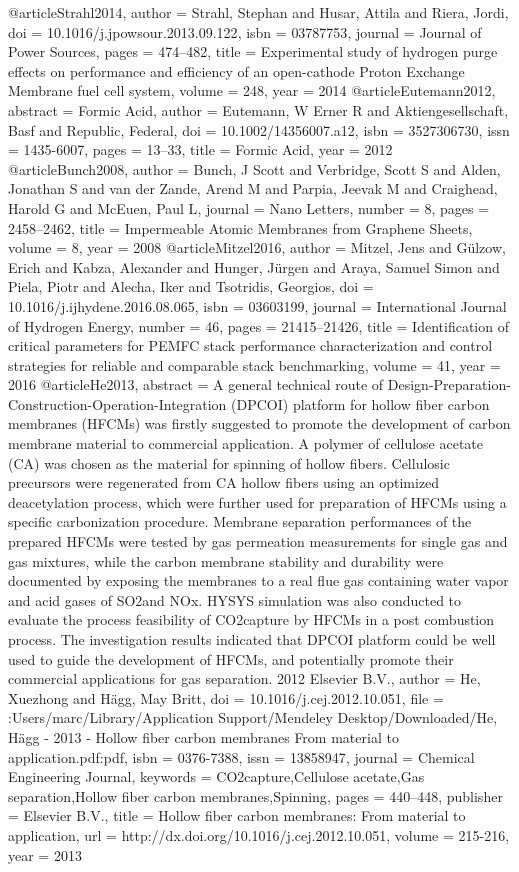 @article{Strahl2014,
author = {Strahl, Stephan and Husar, Attila and Riera, Jordi},
doi = {10.1016/j.jpowsour.2013.09.122},
isbn = {03787753},
journal = {Journal of Power Sources},
pages = {474--482},
title = {{Experimental study of hydrogen purge effects on performance and efficiency of an open-cathode Proton Exchange Membrane fuel cell system}},
volume = {248},
year = {2014}
}
@article{Eutemann2012,
abstract = {Formic Acid},
author = {Eutemann, W Erner R and Aktiengesellschaft, Basf and Republic, Federal},
doi = {10.1002/14356007.a12},
isbn = {3527306730},
issn = {1435-6007},
pages = {13--33},
title = {{Formic Acid}},
year = {2012}
}
@article{Bunch2008,
author = {Bunch, J Scott and Verbridge, Scott S and Alden, Jonathan S and van der Zande, Arend M and Parpia, Jeevak M and Craighead, Harold G and McEuen, Paul L},
journal = {Nano Letters},
number = {8},
pages = {2458--2462},
title = {{Impermeable Atomic Membranes from Graphene Sheets}},
volume = {8},
year = {2008}
}
@article{Mitzel2016,
author = {Mitzel, Jens and G{\"{u}}lzow, Erich and Kabza, Alexander and Hunger, J{\"{u}}rgen and Araya, Samuel Simon and Piela, Piotr and Alecha, Iker and Tsotridis, Georgios},
doi = {10.1016/j.ijhydene.2016.08.065},
isbn = {03603199},
journal = {International Journal of Hydrogen Energy},
number = {46},
pages = {21415--21426},
title = {{Identification of critical parameters for PEMFC stack performance characterization and control strategies for reliable and comparable stack benchmarking}},
volume = {41},
year = {2016}
}
@article{He2013,
abstract = {A general technical route of Design-Preparation-Construction-Operation-Integration (DPCOI) platform for hollow fiber carbon membranes (HFCMs) was firstly suggested to promote the development of carbon membrane material to commercial application. A polymer of cellulose acetate (CA) was chosen as the material for spinning of hollow fibers. Cellulosic precursors were regenerated from CA hollow fibers using an optimized deacetylation process, which were further used for preparation of HFCMs using a specific carbonization procedure. Membrane separation performances of the prepared HFCMs were tested by gas permeation measurements for single gas and gas mixtures, while the carbon membrane stability and durability were documented by exposing the membranes to a real flue gas containing water vapor and acid gases of SO2and NOx. HYSYS simulation was also conducted to evaluate the process feasibility of CO2capture by HFCMs in a post combustion process. The investigation results indicated that DPCOI platform could be well used to guide the development of HFCMs, and potentially promote their commercial applications for gas separation. {\textcopyright} 2012 Elsevier B.V.},
author = {He, Xuezhong and H{\"{a}}gg, May Britt},
doi = {10.1016/j.cej.2012.10.051},
file = {:Users/marc/Library/Application Support/Mendeley Desktop/Downloaded/He, H{\"{a}}gg - 2013 - Hollow fiber carbon membranes From material to application.pdf:pdf},
isbn = {0376-7388},
issn = {13858947},
journal = {Chemical Engineering Journal},
keywords = {CO2capture,Cellulose acetate,Gas separation,Hollow fiber carbon membranes,Spinning},
pages = {440--448},
publisher = {Elsevier B.V.},
title = {{Hollow fiber carbon membranes: From material to application}},
url = {http://dx.doi.org/10.1016/j.cej.2012.10.051},
volume = {215-216},
year = {2013}
}
